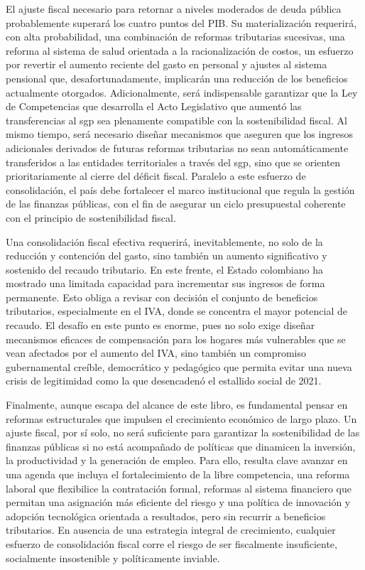 \begin{epilogo}
El ajuste fiscal necesario para retornar a niveles moderados de deuda pública probablemente superará los cuatro puntos del PIB. Su materialización requerirá, con alta probabilidad, una combinación de reformas tributarias sucesivas, una reforma al sistema de salud orientada a la racionalización de costos, un esfuerzo por revertir el aumento reciente del gasto en personal y ajustes al sistema pensional que, desafortunadamente, implicarán una reducción de los beneficios actualmente otorgados. Adicionalmente, será indispensable garantizar que la Ley de Competencias que desarrolla el Acto Legislativo que aumentó las transferencias al \gls{sgp} sea plenamente compatible con la sostenibilidad fiscal. Al mismo tiempo, será necesario diseñar mecanismos que aseguren que los ingresos adicionales derivados de futuras reformas tributarias no sean automáticamente transferidos a las entidades territoriales a través del \gls{sgp}, sino que se orienten prioritariamente al cierre del déficit fiscal. Paralelo a este esfuerzo de consolidación, el país debe fortalecer el marco institucional que regula la gestión de las finanzas públicas, con el fin de asegurar un ciclo presupuestal coherente con el principio de sostenibilidad fiscal.

Una consolidación fiscal efectiva requerirá, inevitablemente, no solo de la reducción y contención del gasto, sino también un aumento significativo y sostenido del recaudo tributario. En este frente, el Estado colombiano ha mostrado una limitada capacidad para incrementar sus ingresos de forma permanente. Esto obliga a revisar con decisión el conjunto de beneficios tributarios, especialmente en el IVA, donde se concentra el mayor potencial de recaudo. El desafío en este punto es enorme, pues no solo exige diseñar mecanismos eficaces de compensación para los hogares más vulnerables que se vean afectados por el aumento del IVA, sino también un compromiso gubernamental creíble, democrático y pedagógico que permita evitar una nueva crisis de legitimidad como la que desencadenó el estallido social de 2021.

Finalmente, aunque escapa del alcance de este libro, es fundamental pensar en reformas estructurales que impulsen el crecimiento económico de largo plazo. Un ajuste fiscal, por sí solo, no será suficiente para garantizar la sostenibilidad de las finanzas públicas si no está acompañado de políticas que dinamicen la inversión, la productividad y la generación de empleo. Para ello, resulta clave avanzar en una agenda que incluya el fortalecimiento de la libre competencia, una reforma laboral que flexibilice la contratación formal, reformas al sistema financiero que permitan una asignación más eficiente del riesgo y una política de innovación y adopción tecnológica orientada a resultados, pero sin recurrir a beneficios tributarios. En ausencia de una estrategia integral de crecimiento, cualquier esfuerzo de consolidación fiscal corre el riesgo de ser fiscalmente insuficiente, socialmente insostenible y políticamente inviable.


\end{epilogo}
